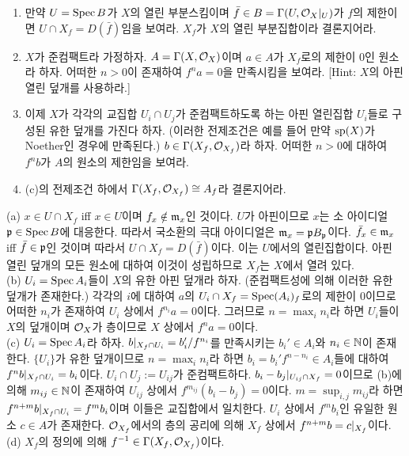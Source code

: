 \begin{enumerate}[label=\tb{2.\arabic*.},itemindent=0mm,itemsep=4mm]
	\begin{enumerate}[label=(\alph*)]
	\item 만약 $U=\Spec B$가 $X$의 열린  부분스킴이며 $\bar f\in B=\Ga(U,\mc O_X\rest_U)$가 $f$의 제한이면
	$U\cap X_f=D(\bar f)$임을 보여라. $X_f$가 $X$의 열린 부분집합이라 결론지어라.
	\item $X$가 준컴팩트라 가정하자. $A=\Ga(X,\mc O_X)$이며 $a\in A$가 $X_f$로의 제한이 0인 원소라 하자.
	어떠한 $n>0$이 존재하여 $f^na=0$을 만족시킴을 보여라. [Hint: $X$의 아핀 열린 덮개를 사용하라.]
	\item 이제 $X$가 각각의 교집합 $U_i\cap U_j$가 준컴팩트하도록 하는 아핀 열린집합 $U_i$들로 구성된 유한 덮개를 가진다 하자.
	(이러한 전제조건은 예를 들어 만약 $\sp(X)$가 Noether인 경우에 만족된다.)
	$b\in\Ga(X_f,\mc O_{X_f})$라 하자. 어떠한 $n>0$에 대하여 $f^nb$가 $A$의 원소의 제한임을 보여라.
	\item (c)의 전제조건 하에서 $\Ga(X_f,\mc O_{X_f})\cong A_f$라 결론지어라.
	\end{enumerate}
	\sol (a) $x\in U\cap X_f$ iff $x\in U$이며 $f_x\notin\mf m_x$인 것이다.
	$U$가 아핀이므로 $x$는 소 아이디얼 $\mf p\in\Spec B$에 대응한다. 따라서 국소환의 극대 아이디얼은 $\mf m_x=\mf pB_{\mf p}$이다.
	$\bar f_x\in\mf m_x$ iff $\bar f\in\mf p$인 것이며 따라서 $U\cap X_f=D(\bar f)$이다. 이는 $U$에서의 열린집합이다.
	아핀 열린 덮개의 모든 원소에 대하여 이것이 성립하므로 $X_f$는 $X$에서 열려 있다.\\
	(b) $U_i=\Spec A_i$들이 $X$의 유한 아핀 덮개라 하자. (준컴팩트성에 의해 이러한 유한 덮개가 존재한다.)
	각각의 $i$에 대하여 $a$의 $U_i\cap X_f=\Spec(A_i)_f$로의 제한이 0이므로 어떠한 $n_i$가 존재하여 $U_i$ 상에서 $f^{n_i}a=0$이다.
	그러므로 $n=\max_in_i$라 하면 $U_i$들이 $X$의 덮개이며 $\mc O_X$가 층이므로 $X$ 상에서 $f^na=0$이다.\\
	(c) $U_i=\Spec A_i$라 하자. $b\rest_{X_f\cap U_i}=b_i'/f^{n_i}$를 만족시키는 $b_i'\in A_i$와 $n_i\in\N$이 존재한다.
 	$\{U_i\}$가 유한 덮개이므로 $n=\max_in_i$라 하면 $b_i=b_i'f^{n-n_i}\in A_i$들에 대하여 $f^nb\rest_{X_f\cap U_i}=b_i$이다.
	$U_i\cap U_j:=U_{ij}$가 준컴팩트하다. $b_i-b_j\rest_{U_{ij}\cap X_f}=0$이므로
	(b)에 의해 $m_{ij}\in\N$이 존재하여 $U_{ij}$ 상에서 $f^{m_{ij}}(b_i-b_j)=0$이다.
	$m=\sup_{i,j}m_{ij}$라 하면 $f^{n+m}b\rest_{X_f\cap U_i}=f^mb_i$이며 이들은 교집합에서 일치한다.
	$U_i$ 상에서 $f^mb_i$인 유일한 원소 $c\in A$가 존재한다.
	$\mc O_{X_f}$에서의 층의 공리에 의해 $X_f$ 상에서 $f^{n+m}b=c\rest_{X_f}$이다.\\
	(d) $X_f$의 정의에 의해 $f^{-1}\in\Ga(X_f,\mc O_{X_f})$이다.

\end{enumerate}
